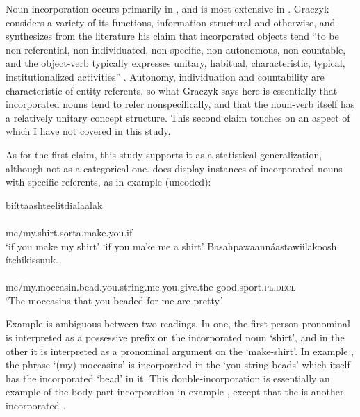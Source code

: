\documentclass[output=paper]{LSP/langsci}
\begin{document}
Noun incorporation occurs primarily in , and is most extensive in . Graczyk considers a variety of its functions, information-structural and otherwise, and synthesizes from the literature his claim that incorporated objects tend “to be non-referential, non-individuated, non-specific, non-autonomous, non-countable, and the object-verb  typically expresses unitary, habitual, characteristic, typical, institutionalized activities” \citeyearpar[244]{Graczyk1991a}. Autonomy, individuation and countability are characteristic of entity referents, so what Graczyk says here is essentially that incorporated nouns tend to refer nonspecifically, and that the noun-verb  itself has a relatively unitary concept structure. This second claim touches on an aspect of  which I have not covered in this study.

As for the first claim, this study supports it as a statistical generalization, although not as a categorical one.  does display instances of incorporated nouns with specific referents, as in example  (uncoded):

\ea\label{shirtmoccasin}
\ea\label{incorpshirt}
biíttaashteelitdialaalak\rmfnm\\
\gll	{}\\
	me/my.shirt.sorta.make.you.if\\
\glt	`if you make my shirt'  `if you make me a shirt'
\ex\label{incorpmoccasin}
Basahpawaannáastawiilakoosh ítchikissuuk.\rmfnm\\
\gll	{}					\\
	me/my.moccasin.bead.you.string.me.you.give.the 		good.sport.\textsc{pl.decl}\\

\glt	`The moccasins that you beaded for me are pretty.' 
\z\z
{}	

Example  is ambiguous between two readings. In one, the first person pronominal  is interpreted as a possessive prefix on the incorporated noun   `shirt', and in the other it is interpreted as a pronominal argument on the   `make-shirt'. In example , the  phrase  `(my) moccasins' is incorporated in the   `you string beads' which itself has the incorporated  `bead' in it. This double-incorporation is essentially an example of the body-part incorporation in example , except that the  is another incorporated .
\end{document}
